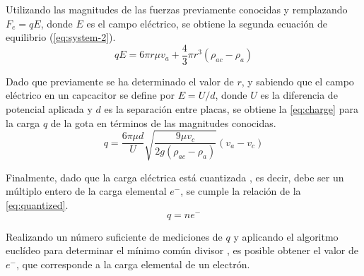 Utilizando las magnitudes de las fuerzas previamente conocidas y remplazando
\(F_e=qE \), donde $E$ es el campo eléctrico, se obtiene la segunda ecuación de
equilibrio (\cref{eq:system-2}).
\begin{equation}\label{eq:system-2}
    qE = 6\pi r\mu v_a + \frac{4}{3}\pi r^3(\rho_{ac}-\rho_a)
\end{equation}

Dado que previamente se ha determinado el valor de \(r\), y sabiendo que el campo
eléctrico en un capcacitor se define por \( E = U / d \), donde $U$ es la
diferencia de potencial aplicada y $d$ es la separación entre placas, se obtiene
la \cref{eq:charge} para la carga \(q\) de la gota en términos de las magnitudes
conocidas.
\begin{equation}\label{eq:charge}
    q = \frac{6\pi \mu d}{U}\sqrt{\frac{9\mu v_c}{2g(\rho_{ac}-\rho_a)}}(v_a-v_c)
\end{equation}

Finalmente, dado que la carga eléctrica está cuantizada \cite{}, es decir,
debe ser un múltiplo entero de la carga elemental \(e^{-}\), se cumple la
relación de la \cref{eq:quantized}.
\begin{equation}\label{eq:quantized}
    q=ne^-
\end{equation}

Realizando un número suficiente de mediciones de \(q\) y aplicando el algoritmo
euclídeo para determinar el mínimo común divisor \cite{}, es posible obtener el
valor de \(e^{-}\), que corresponde a la carga elemental de un electrón.
